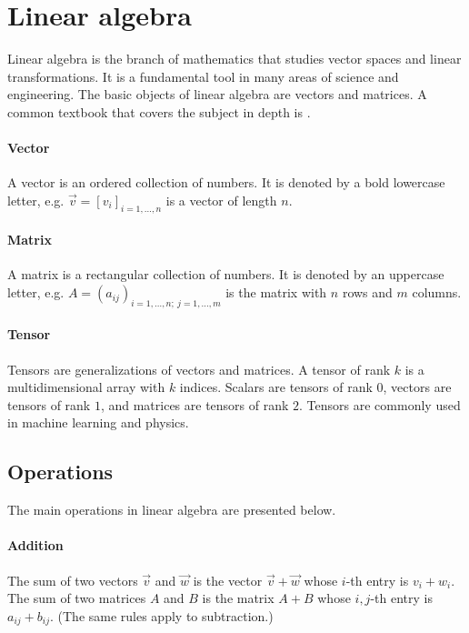 \section{Linear algebra}

Linear algebra is the branch of mathematics that studies vector spaces and linear
transformations.  It is a fundamental tool in many areas of science and engineering.
The basic objects of linear algebra are vectors and matrices.  A common textbook that
covers the subject in depth is \textcite{Strang2023}.

\paragraph{Vector}  A vector is an ordered collection of numbers.  It is denoted by a bold
lowercase letter, e.g. $\vec{v} = [v_i]_{i= 1,\dots, n}$ is a vector of length $n$.

\paragraph{Matrix}  A matrix is a rectangular collection of numbers.  It is denoted by an
uppercase letter, e.g. $A = (a_{ij})_{i = 1, \dots, n;~j = 1, \dots, m}$ is the matrix
with $n$ rows and $m$ columns.

\paragraph{Tensor}  Tensors are generalizations of vectors and matrices.  A tensor of rank
$k$ is a multidimensional array with $k$ indices.  Scalars are tensors of rank $0$,
vectors are tensors of rank $1$, and matrices are tensors of rank $2$.  Tensors are
commonly used in machine learning and physics.

\subsection{Operations}

The main operations in linear algebra are presented below.

\paragraph{Addition}  The sum of two vectors $\vec{v}$ and $\vec{w}$ is the vector
$\vec{v} + \vec{w}$ whose $i$-th entry is $v_i + w_i$.  The sum of two matrices $A$ and
$B$ is the matrix $A + B$ whose $i, j$-th entry is $a_{ij} + b_{ij}$.  (The same rules apply
to subtraction.)

